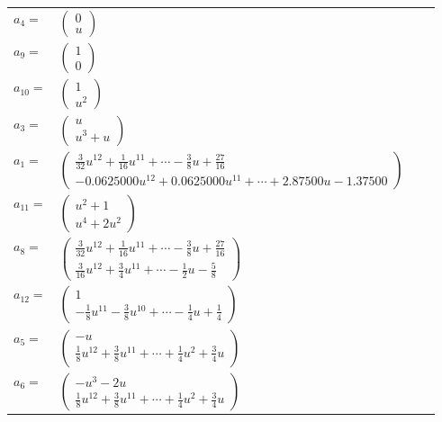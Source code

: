 \documentclass[1p]{elsarticle_modified}
\theoremstyle{definition}
\begin{document}
\begin{tabular}{m{7pt} m{180pt} m{7pt} m{180pt} }
\flushright $a_{4}=$&$\begin{pmatrix}0\\u\end{pmatrix}$ \\
\flushright $a_{9}=$&$\begin{pmatrix}1\\0\end{pmatrix}$ \\
\flushright $a_{10}=$&$\begin{pmatrix}1\\u^2\end{pmatrix}$ \\
\flushright $a_{3}=$&$\begin{pmatrix}u\\u^3+u\end{pmatrix}$ \\
\flushright $a_{1}=$&$\begin{pmatrix}\frac{3}{32} u^{12}+\frac{1}{16} u^{11}+\cdots-\frac{3}{8} u+\frac{27}{16}\\-0.0625000 u^{12}+0.0625000 u^{11}+\cdots+2.87500 u-1.37500\end{pmatrix}$ \\
\flushright $a_{11}=$&$\begin{pmatrix}u^2+1\\u^4+2 u^2\end{pmatrix}$ \\
\flushright $a_{8}=$&$\begin{pmatrix}\frac{3}{32} u^{12}+\frac{1}{16} u^{11}+\cdots-\frac{3}{8} u+\frac{27}{16}\\\frac{3}{16} u^{12}+\frac{3}{4} u^{11}+\cdots-\frac{1}{2} u-\frac{5}{8}\end{pmatrix}$ \\
\flushright $a_{12}=$&$\begin{pmatrix}1\\-\frac{1}{8} u^{11}-\frac{3}{8} u^{10}+\cdots-\frac{1}{4} u+\frac{1}{4}\end{pmatrix}$ \\
\flushright $a_{5}=$&$\begin{pmatrix}- u\\\frac{1}{8} u^{12}+\frac{3}{8} u^{11}+\cdots+\frac{1}{4} u^2+\frac{3}{4} u\end{pmatrix}$ \\
\flushright $a_{6}=$&$\begin{pmatrix}- u^3-2 u\\\frac{1}{8} u^{12}+\frac{3}{8} u^{11}+\cdots+\frac{1}{4} u^2+\frac{3}{4} u\end{pmatrix}$ \\

\end{tabular}
\end{document}
